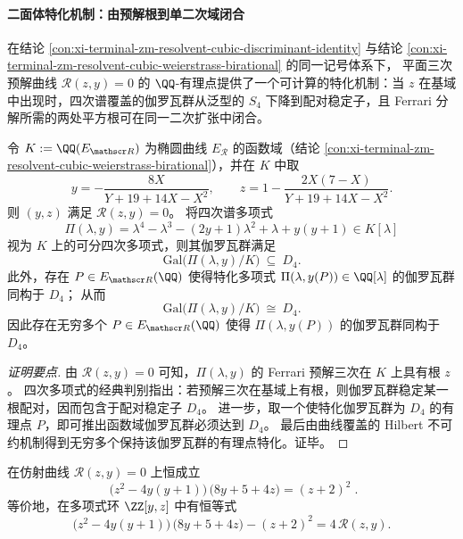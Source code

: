 \paragraph{二面体特化机制：由预解根到单二次域闭合}
在结论 \ref{con:xi-terminal-zm-resolvent-cubic-discriminant-identity} 与结论
\ref{con:xi-terminal-zm-resolvent-cubic-weierstrass-birational} 的同一记号体系下，
平面三次预解曲线 \(\mathscr R(z,y)=0\) 的 \(\QQ\)-有理点提供了一个可计算的特化机制：当 \(z\) 在基域中出现时，四次谱覆盖的伽罗瓦群从泛型的 \(S_4\) 下降到配对稳定子，且 Ferrari 分解所需的两处平方根可在同一二次扩张中闭合。

\begin{theorem}\label{thm:xi-terminal-zm-dihedral-d4-specialization-functionfield}
令 \(K:=\QQ(E_{\mathscr R})\) 为椭圆曲线 \(E_{\mathscr R}\) 的函数域（结论 \ref{con:xi-terminal-zm-resolvent-cubic-weierstrass-birational}），并在 \(K\) 中取
\[
y=-\frac{8X}{Y+19+14X-X^2},
\qquad
z=1-\frac{2X(7-X)}{Y+19+14X-X^2}.
\]
则 \((y,z)\) 满足 \(\mathscr R(z,y)=0\)。
将四次谱多项式
\[
\Pi(\lambda,y)=\lambda^{4}-\lambda^{3}-(2y+1)\lambda^{2}+\lambda+y(y+1)
\in K[\lambda]
\]
视为 \(K\) 上的可分四次多项式，则其伽罗瓦群满足
\[
\mathrm{Gal}\bigl(\Pi(\lambda,y)/K\bigr)\ \subseteq\ D_4.
\]
此外，存在 \(P\in E_{\mathscr R}(\QQ)\) 使得特化多项式 \(\Pi(\lambda,y(P))\in\QQ[\lambda]\) 的伽罗瓦群同构于 \(D_4\)；
从而
\[
\mathrm{Gal}\bigl(\Pi(\lambda,y)/K\bigr)\ \cong\ D_4.
\]
因此存在无穷多个 \(P\in E_{\mathscr R}(\QQ)\) 使得 \(\Pi(\lambda,y(P))\) 的伽罗瓦群同构于 \(D_4\)。
\end{theorem}

\begin{proof}[证明要点]
由 \(\mathscr R(z,y)=0\) 可知，\(\Pi(\lambda,y)\) 的 Ferrari 预解三次在 \(K\) 上具有根 \(z\)。
四次多项式的经典判别指出：若预解三次在基域上有根，则伽罗瓦群稳定某一根配对，因而包含于配对稳定子 \(D_4\)。
进一步，取一个使特化伽罗瓦群为 \(D_4\) 的有理点 \(P\)，即可推出函数域伽罗瓦群必须达到 \(D_4\)。
最后由曲线覆盖的 Hilbert 不可约机制得到无穷多个保持该伽罗瓦群的有理点特化。证毕。
\end{proof}

\begin{proposition}[预解曲线上的二判别式锁定恒等式]\label{prop:xi-terminal-zm-dihedral-double-discriminant-lock}
在仿射曲线 \(\mathscr R(z,y)=0\) 上恒成立
\[
\boxed{\;
\bigl(z^{2}-4y(y+1)\bigr)\,\bigl(8y+5+4z\bigr)=(z+2)^{2}\; }.
\]
等价地，在多项式环 \(\ZZ[y,z]\) 中有恒等式
\[
\bigl(z^{2}-4y(y+1)\bigr)\,\bigl(8y+5+4z\bigr)-(z+2)^{2}=4\,\mathscr R(z,y).
\]
\end{proposition}

